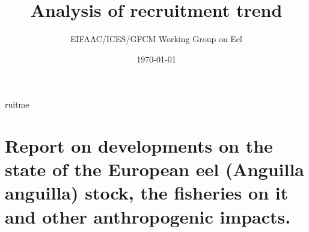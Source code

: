 ruitme\documentclass[pdftex,11pt,a4paper]{report}
\begin{document}


\title{ Analysis of recruitment trend}
\author{EIFAAC/ICES/GFCM Working Group on Eel}
\date\today
\maketitle
\newpage
\tableofcontents
\subsection*{}
\addtocounter{chapter}{1}
\chapter{Report on developments on the state of the European eel (Anguilla
anguilla) stock, the fisheries on it and other anthropogenic impacts.}






\end{document}
